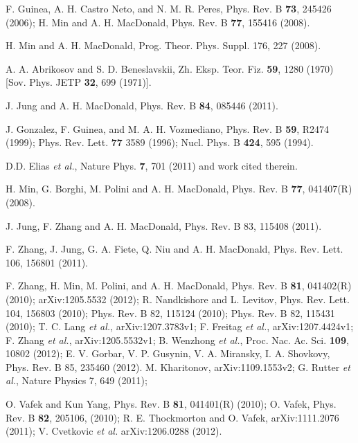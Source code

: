 \documentclass[twocolumn,prb,showpacs,preprintnumbers,amsmath,amssymb]{revtex4}
\begin{document}
\begin{thebibliography}{99}

F. Guinea, A. H. Castro Neto, and N. M. R. Peres, Phys. Rev. B {\bf 73}, 245426 (2006);
H. Min and A. H. MacDonald, Phys. Rev. B {\bf 77}, 155416 (2008).

H. Min and A. H. MacDonald, Prog. Theor. Phys. Suppl. 176, 227 (2008).


A. A. Abrikosov and S. D. Beneslavskii, Zh. Eksp. Teor. Fiz. {\bf 59}, 1280 (1970)
[Sov. Phys. JETP {\bf 32}, 699 (1971)].


J. Jung and A. H. MacDonald, Phys. Rev. B {\bf 84}, 085446 (2011).


J. Gonzalez, F. Guinea, and M. A. H. Vozmediano, Phys. Rev. B {\bf 59}, R2474 (1999); 
Phys. Rev. Lett. {\bf 77} 3589 (1996); Nucl. Phys. B {\bf 424}, 595 (1994).


D.D. Elias {\em et al.}, Nature Phys. {\bf 7}, 701 (2011) and work cited therein.  


      H. Min, G. Borghi, M. Polini and A. H. MacDonald, 
                Phys. Rev. B {\bf 77}, 041407(R) (2008).


J. Jung, F. Zhang and A. H. MacDonald, Phys. Rev. B 83, 115408 (2011).
             
             
F. Zhang, J. Jung, G. A. Fiete, Q. Niu and A. H. MacDonald,
Phys. Rev. Lett. 106, 156801 (2011).
             
             
F. Zhang, H. Min, M. Polini, and A. H. MacDonald, 
Phys. Rev. B {\bf 81}, 041402(R) (2010); arXiv:1205.5532 (2012);
R. Nandkishore and L. Levitov, Phys. Rev. Lett. 104, 156803 (2010); Phys. Rev. B 82, 115124 (2010);
Phys. Rev. B 82, 115431 (2010);
T. C. Lang {\em et al.}, arXiv:1207.3783v1;
F. Freitag {\em et al.}, arXiv:1207.4424v1;
F. Zhang {\em et al.},  	arXiv:1205.5532v1;
B. Wenzhong {\em et al.},  Proc. Nac. Ac. Sci. {\bf 109}, 10802 (2012);
E. V. Gorbar, V. P. Gusynin, V. A. Miransky, I. A. Shovkovy, Phys. Rev. B 85, 235460 (2012). 
M. Kharitonov, arXiv:1109.1553v2;
G. Rutter {\em et al.},     Nature Physics   7,    649   (2011);


O. Vafek and Kun Yang, Phys. Rev. B {\bf 81}, 041401(R) (2010);
O. Vafek, Phys. Rev. B {\bf 82}, 205106, (2010);
R. E. Thockmorton and O. Vafek, arXiv:1111.2076 (2011);
V. Cvetkovic {\em et al.} arXiv:1206.0288 (2012).


\end{thebibliography}
\end{document}
